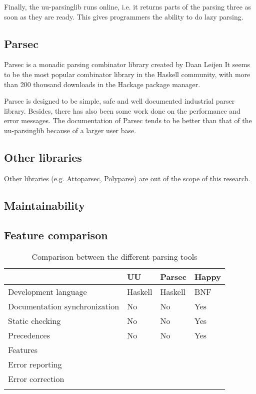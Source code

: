 Finally, the uu-parsinglib runs online, i.e. it returns parts of the parsing three as soon as they are ready.
This gives programmers the ability to do lazy parsing.

\subsection{Parsec}
%
Parsec is a monadic parsing combinator library created by Daan Leijen
It seems to be the most popular combinator library in the Haskell community, with more than 200 thousand downloads in the Hackage package manager.

Parsec is designed to be simple, safe and well documented industrial parser library.
Besides, there has also been some work done on the performance and error messages.
The documentation of Parsec tends to be better than that of the uu-parsinglib because of a larger user base.



\subsection{Other libraries}
Other libraries (e.g. Attoparsec, Polyparse) are out of the scope of this research.

\subsection{Maintainability}

\subsection{Feature comparison}
\begin{longtable}{|l|l|l|l|}\hline
	\textbf{} & \textbf{UU} & \textbf{Parsec} & \textbf{Happy} \\\hline
	\endhead
	
	Development language 	  & Haskell & Haskell & BNF \\\hline
	Documentation synchronization  & No & No & Yes \\\hline
	Static checking			  & No & No & Yes \\\hline
	Precedences & No & No & Yes \\\hline
	Features & & & \\\hline
	Error reporting & & & \\\hline
	Error correction & & & \\\hline
	
	\caption{Comparison between the different parsing tools}
	\label{tab:comparison}
\end{longtable}


